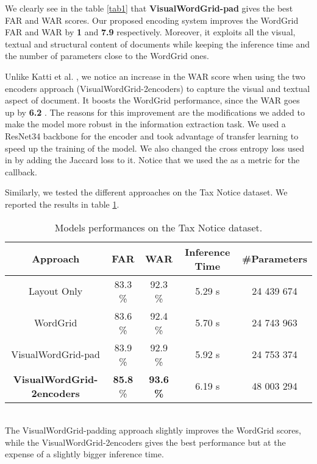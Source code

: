 \documentclass[conference]{IEEEtran}
\begin{document}
We clearly see in the table \ref{tab1} that \textbf{VisualWordGrid-pad} gives the best FAR and WAR scores. Our proposed encoding system improves the WordGrid FAR and WAR by \textbf{1 } and  \textbf{7.9 } respectively. Moreover, it exploits all the visual, textual and structural content of documents while keeping the inference time and  the number of  parameters close to the WordGrid ones. 

Unlike Katti et al. \cite{chargrid}, we notice an increase in the WAR score when using the two encoders approach (VisualWordGrid-2encoders)  to capture the visual and textual aspect of document. It boosts the WordGrid performance, since the WAR goes up by \textbf{6.2 }.
The reasons for this improvement are the modifications we added to make the model  more robust in the information extraction task. We used a ResNet34 backbone for the encoder and took advantage of transfer learning to speed up the training of the model. We also changed the cross entropy loss used in \cite{chargrid} by adding the Jaccard loss to it. Notice that we  used the  as a metric for the callback. 

Similarly, we tested the different approaches on the Tax Notice dataset. We reported the results in table \ref{tab2}.
 \begin{table}[!htbp] 
 \begin{adjustbox}{width=.485\textwidth,center}
\label{tab:schemes2} 
\centering 
\begin{tabular}{|c|c|c|c|c|}
\hline
 Approach & FAR    & WAR & Inference Time& \#Parameters   \\
\hline

Layout Only  & 83.3 \%   &   92.3 \% & 5.29 s & 24 439 674\\
\hline
WordGrid  & 83.6 \%   &  92.4 \% & 5.70 s & 24 743 963\\
\hline
VisualWordGrid-pad  & 83.9 \%  &  92.9 \% & 5.92 s &  24 753 374\\
\hline
\textbf{VisualWordGrid-2encoders}  & \textbf{85.8} \%   &  \textbf{93.6 \%} & 6.19 s & 48 003 294 \\

\hline
\end{tabular}
\end{adjustbox}
\caption{Models performances  on the Tax Notice dataset.}
\label{tab2}
\end{table}\\

The VisualWordGrid-padding approach slightly improves the WordGrid scores, while the VisualWordGrid-2encoders gives the best performance but at the expense of a slightly bigger inference time.
\end{document}
